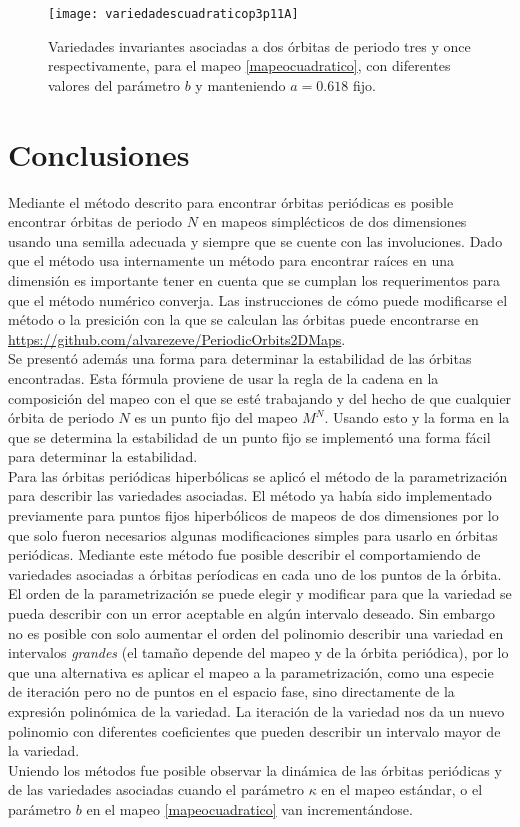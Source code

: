 \begin{figure}[H]
	\texttt{[image: variedadescuadraticop3p11A]}
	\caption{Variedades invariantes asociadas a dos \'orbitas de periodo tres y once respectivamente, para el mapeo \eqref{mapeocuadratico}, con diferentes valores del par\'ametro $b$ y manteniendo $a=0.618$ fijo.}
	\label{variedadescuadraticoper3per11vark}
\end{figure}
\section{Conclusiones}
Mediante el m\'etodo descrito para encontrar \'orbitas peri\'odicas es posible encontrar \'orbitas de periodo $N$ en mapeos simpl\'ecticos de dos dimensiones usando una semilla adecuada y siempre que se cuente con las involuciones. Dado que el m\'etodo usa internamente un m\'etodo para encontrar ra\'ices en una dimensi\'on es importante tener en cuenta que se cumplan los requerimentos para que el m\'etodo num\'erico converja. Las instrucciones de c\'omo puede modificarse el m\'etodo o la presici\'on con la que se calculan las \'orbitas puede encontrarse en \url{https://github.com/alvarezeve/PeriodicOrbits2DMaps}. \\

Se present\'o adem\'as una forma para determinar la estabilidad de las \'orbitas encontradas. Esta f\'ormula proviene de usar la regla de la cadena en la composici\'on del mapeo con el que se est\'e trabajando y del hecho de que cualquier \'orbita de periodo $N$ es un punto fijo del mapeo $M^{N}$. Usando esto y la forma en la que se determina la estabilidad de un punto fijo se implement\'o una forma f\'acil para determinar la estabilidad.\\

Para las \'orbitas peri\'odicas hiperb\'olicas se aplic\'o el m\'etodo de la parametrizaci\'on para describir las variedades asociadas. El m\'etodo ya hab\'ia sido implementado previamente para puntos fijos hiperb\'olicos de mapeos de dos dimensiones por lo que solo fueron necesarios algunas modificaciones simples para usarlo en \'orbitas peri\'odicas. Mediante este m\'etodo fue posible describir el comportamiendo de variedades asociadas a \'orbitas per\'iodicas en cada uno de los puntos de la \'orbita.\\

El orden de la parametrizaci\'on se puede elegir y modificar para que la variedad se pueda describir con un error aceptable en alg\'un intervalo deseado. Sin embargo no es posible con solo aumentar el orden del polinomio describir una variedad en intervalos \textit{grandes} (el tamaño depende del mapeo y de la \'orbita peri\'odica), por lo que una alternativa es aplicar el mapeo a la parametrizaci\'on, como una especie de iteraci\'on pero no de puntos en el espacio fase, sino directamente de la expresi\'on polin\'omica de la variedad. La iteraci\'on de la variedad nos da un nuevo polinomio con diferentes coeficientes que pueden describir un intervalo mayor de la variedad. \\

Uniendo los m\'etodos fue posible observar la din\'amica de las \'orbitas peri\'odicas y de las variedades asociadas cuando el par\'ametro $\kappa$ en el mapeo est\'andar, o el par\'ametro $b$ en el mapeo \eqref{mapeocuadratico} van increment\'andose. 






